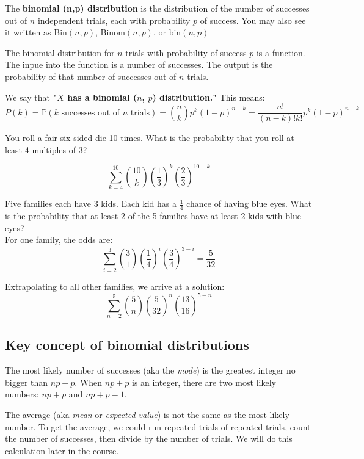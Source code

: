 \documentclass[titlepage, 12pt, leqno]{article}
\begin{document}
\begin{definition}
    The \textbf{binomial (n,p) distribution} is the distribution of the number of successes out of $n$ independent trials, each with probability $p$ of success. You may also see it written as $\text{Bin}(n,p)$, $\text{Binom}(n,p)$, or $\text{bin}(n,p)$ 
\end{definition}

The binomial distribution for $n$ trials with probability of success $p$ is a function. The inpue into the function is a number of successes. The output is the probability of that number of successes out of $n$ trials.

We say that \textbf{"$X$ has a binomial ($n$, $p$) distribution."} This means:   
\[
    \boxed{P(k) = \mathbb{P}(k \text{ successes out of } n \text{ trials}) = \binom{n}{k}p^k(1-p)^{n-k} = \frac{n!}{(n-k)!k!}p^k(1-p)^{n-k}}
\]

\begin{ex}
    You roll a fair six-sided die 10 times. What is the probability that you roll at least 4 multiples of 3?

    \[
        \boxed{\sum_{k=4}^{10}\binom{10}{k}\left(\frac{1}{3}\right)^k\left(\frac{2}{3}\right)^{10-k}} 
    \]
\end{ex}

\begin{ex}
    Five families each have 3 kids. Each kid has a $\frac{1}{4}$ chance of having blue eyes. What is the probability that at least 2 of the 5 families have at least 2 kids with blue eyes?\\[.1in]
    For one family, the odds are:
    \[
        \sum_{i=2}^{3}\binom{3}{1}\left(\frac{1}{4}\right)^i\left(\frac{3}{4}\right)^{3-i} = \frac{5}{32} 
    \]
    
    Extrapolating to all other families, we arrive at a solution:
    \[
    \boxed{\sum_{n=2}^{5}\binom{5}{n}\left(\frac{5}{32}\right)^n\left(\frac{13}{16}\right)^{5-n}}
    \]
\end{ex}
\pagebreak

\subsection{Key concept of binomial distributions}
The most likely number of successes (aka the \textit{mode}) is the greatest integer no bigger than $np+p$. When $np+p$ is an integer, there are two most likely numbers: $np+p$ and $np+p-1$.

The average (aka \textit{mean} or \textit{expected value}) is not the same as the most likely number. To get the average, we could run repeated trials of repeated trials, count the number of successes, then divide by the number of trials. We will do this calculation later in the course.
\end{document}
